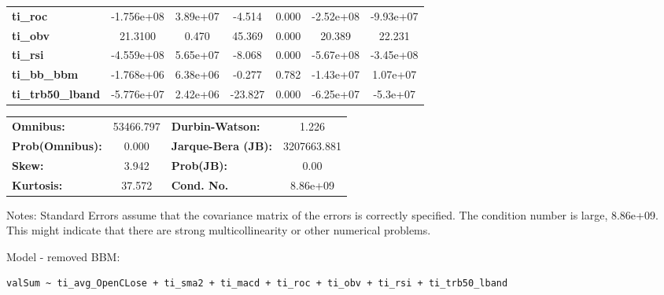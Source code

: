 \begin{center}
\begin{tabular}{lcccccc}
\textbf{ti\_roc}            &   -1.756e+08  &     3.89e+07     &    -4.514  &         0.000        &    -2.52e+08    &    -9.93e+07     \\
\textbf{ti\_obv}            &      21.3100  &        0.470     &    45.369  &         0.000        &       20.389    &       22.231     \\
\textbf{ti\_rsi}            &   -4.559e+08  &     5.65e+07     &    -8.068  &         0.000        &    -5.67e+08    &    -3.45e+08     \\
\textbf{ti\_bb\_bbm}        &   -1.768e+06  &     6.38e+06     &    -0.277  &         0.782        &    -1.43e+07    &     1.07e+07     \\
\textbf{ti\_trb50\_lband}   &   -5.776e+07  &     2.42e+06     &   -23.827  &         0.000        &    -6.25e+07    &     -5.3e+07     \\
\bottomrule
\end{tabular}
\begin{tabular}{lclc}
\textbf{Omnibus:}       & 53466.797 & \textbf{  Durbin-Watson:     } &      1.226   \\
\textbf{Prob(Omnibus):} &    0.000  & \textbf{  Jarque-Bera (JB):  } & 3207663.881  \\
\textbf{Skew:}          &    3.942  & \textbf{  Prob(JB):          } &       0.00   \\
\textbf{Kurtosis:}      &   37.572  & \textbf{  Cond. No.          } &   8.86e+09   \\
\bottomrule
\end{tabular}
\end{center}

Notes: \newline
 [1] Standard Errors assume that the covariance matrix of the errors is correctly specified. \newline
 [2] The condition number is large, 8.86e+09. This might indicate that there are \newline
 strong multicollinearity or other numerical problems.

Model - removed BBM: \begin{verbatim}valSum ~ ti_avg_OpenCLose + ti_sma2 + ti_macd + ti_roc + ti_obv + ti_rsi + ti_trb50_lband\end{verbatim}

